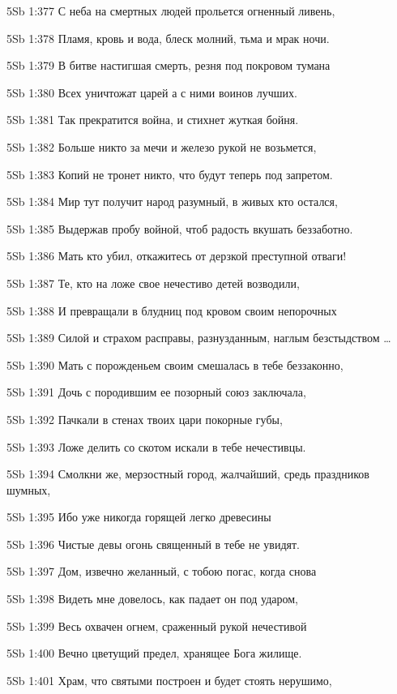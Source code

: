 \vs 5Sb 1:377 С неба на смертных людей прольется огненный ливень,

\vs 5Sb 1:378 Пламя, кровь и вода, блеск молний, тьма и мрак ночи.

\vs 5Sb 1:379 В битве настигшая смерть, резня под покровом тумана 

\vs 5Sb 1:380 Всех уничтожат царей  а с ними воинов лучших.

\vs 5Sb 1:381 Так прекратится война, и стихнет жуткая бойня.

\vs 5Sb 1:382 Больше никто за мечи и железо рукой не возьмется,

\vs 5Sb 1:383 Копий не тронет никто, что будут теперь под запретом.

\vs 5Sb 1:384 Мир тут получит народ разумный, в живых кто остался, 

\vs 5Sb 1:385 Выдержав пробу войной, чтоб радость вкушать беззаботно.

\vs 5Sb 1:386 Мать кто убил, откажитесь от дерзкой преступной отваги! 

\vs 5Sb 1:387 Те, кто на ложе свое нечестиво детей возводили, 

\vs 5Sb 1:388 И превращали в блудниц под кровом своим непорочных 

\vs 5Sb 1:389 Силой и страхом расправы, разнузданным, наглым безстыдством \ldots

\vs 5Sb 1:390 Мать с порожденьем своим смешалась в тебе беззаконно, 

\vs 5Sb 1:391 Дочь с породившим ее позорный союз заключала, 

\vs 5Sb 1:392 Пачкали в стенах твоих цари покорные губы, 

\vs 5Sb 1:393 Ложе делить со скотом искали в тебе нечестивцы. 

\vs 5Sb 1:394 Смолкни же, мерзостный город, жалчайший, средь праздников шумных,

\vs 5Sb 1:395 Ибо уже никогда горящей легко древесины 

\vs 5Sb 1:396 Чистые девы огонь священный в тебе не увидят. 

\vs 5Sb 1:397 Дом, извечно желанный, с тобою погас, когда снова 

\vs 5Sb 1:398 Видеть мне довелось, как падает он под ударом, 

\vs 5Sb 1:399 Весь охвачен огнем, сраженный рукой нечестивой 

\vs 5Sb 1:400 Вечно цветущий предел, хранящее Бога жилище. 

\vs 5Sb 1:401 Храм, что святыми построен и будет стоять нерушимо, 

